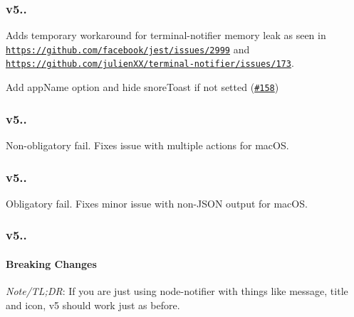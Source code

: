 \subsubsection*{{\ttfamily v5..}}


\begin{DoxyItemize}
\item Adds temporary workaround for {\ttfamily terminal-\/notifier} memory leak as seen in \href{https://github.com/facebook/jest/issues/2999}{\tt https\+://github.\+com/facebook/jest/issues/2999} and \href{https://github.com/julienXX/terminal-notifier/issues/173}{\tt https\+://github.\+com/julien\+X\+X/terminal-\/notifier/issues/173}.
\item Add app\+Name option and hide snore\+Toast if not setted (\href{https://github.com/mikaelbr/node-notifier/pull/158}{\tt \#158})
\end{DoxyItemize}

\subsubsection*{{\ttfamily v5..}}

Non-\/obligatory fail. Fixes issue with multiple actions for mac\+OS.

\subsubsection*{{\ttfamily v5..}}

Obligatory fail. Fixes minor issue with non-\/\+J\+S\+ON output for mac\+OS.

\subsubsection*{{\ttfamily v5..}}

\paragraph*{Breaking Changes}

{\itshape Note/\+TL;DR}\+: If you are just using {\ttfamily node-\/notifier} with things like {\ttfamily message}, {\ttfamily title} and {\ttfamily icon}, v5 should work just as before.


